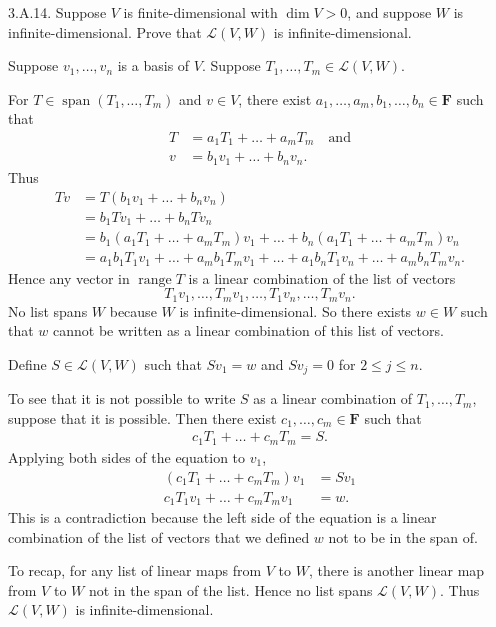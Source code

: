 \documentclass[a5paper]{article}
\begin{document}
\newcommand   \C           {\mathbf{C}}
\newcommand   \R           {\mathbf{R}}
\renewcommand \L           {\mathcal{L}}
\newcommand   \F           {\mathbf{F}}
\renewcommand \P           {\mathcal{P}}
\newcommand   \M           {\mathcal{M}}
\newcommand   \op          {\operatorname}

    3.A.14.
    Suppose $V$ is finite-dimensional with $\op{dim}V > 0$, and suppose $W$ is infinite-dimensional.
    Prove that $\L(V,W)$ is infinite-dimensional.

    Suppose $v_1,\dots,v_n$ is a basis of $V$.
    Suppose $T_1,\dots,T_m \in \L(V,W)$.

    For $T \in \op{span}(T_1,\dots,T_m)$ and $v \in V$, there exist $a_1,\dots,a_m,b_1,\dots,b_n \in \F$ such that
\begin{align*}
        T &= a_1T_1+\dots+a_mT_m \quad \text{and} \\
        v &= b_1v_1+\dots+b_nv_n .
\end{align*}
    Thus
\begin{align*}
        Tv &= T(b_1v_1+\dots+b_nv_n) \\
           &= b_1Tv_1 + \dots + b_nTv_n \\
           &= b_1(a_1T_1+\dots+a_mT_m)v_1 + \dots + b_n(a_1T_1+\dots+a_mT_m)v_n \\
           &= a_1b_1T_1v_1+\dots+a_mb_1T_mv_1 + \dots + a_1b_nT_1v_n+\dots+a_mb_nT_mv_n .
\end{align*}
    Hence any vector in $\op{range}T$ is a linear combination of the list of vectors
\begin{equation*}
        T_1v_1,\dots,T_mv_1, \dots, T_1v_n,\dots,T_mv_n .
\end{equation*}
    No list spans $W$ because $W$ is infinite-dimensional.
    So there exists $w \in W$ such that $w$ cannot be written as a linear combination of this list of vectors.

    Define $S \in \L(V,W)$ such that $Sv_1=w$ and $Sv_j=0$ for $2 \le j \le n$.

    To see that it is not possible to write $S$ as a linear combination of $T_1,\dots,T_m$, suppose that it is possible.
    Then there exist $c_1,\dots,c_m \in \F$ such that
\begin{align*}
        c_1T_1 + \dots + c_mT_m = S .
\end{align*}
    Applying both sides of the equation to $v_1$,
\begin{align*}
        (c_1T_1 + \dots + c_mT_m)v_1  &= Sv_1 \\
        c_1T_1v_1 + \dots + c_mT_mv_1 &= w .
\end{align*}
    This is a contradiction because the left side of the equation is a linear combination of the list of vectors that we defined $w$ not to be in the span of.

    To recap, for any list of linear maps from $V$ to $W$, there is another linear map from $V$ to $W$ not in the span of the list.
    Hence no list spans $\L(V,W)$.
    Thus $\L(V,W)$ is infinite-dimensional.
\end{document}

